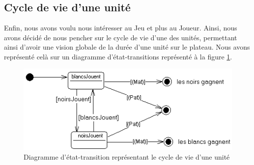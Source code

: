 \subsection{Cycle de vie d'une unité}
Enfin, nous avons voulu nous intéresser au Jeu et plus au Joueur. Ainsi, nous avons décidé de nous pencher sur le cycle de vie d'une des unités, permettant ainsi d'avoir une vision globale de la durée d'une unité sur le plateau. Nous avons représenté celà sur un diagramme d'état-transitions représenté à la figure \ref{etata}.

\begin{figure}[!h] 
\centerline{\includegraphics[scale=0.30]{img/etata_ex.png}}
   \caption{\label{étiquette} Diagramme d'état-transition représentant le cycle de vie d'une unité}
\label{etata}
\end{figure}
\newpage
